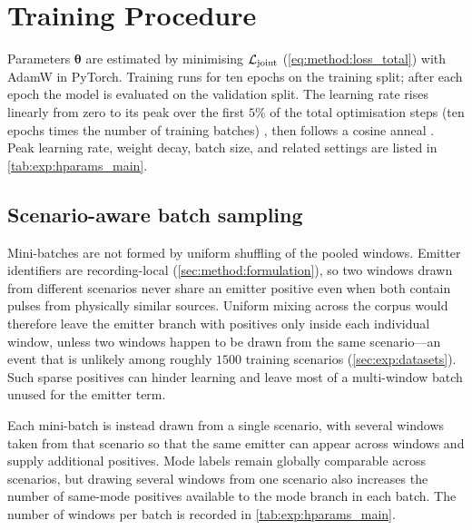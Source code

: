 \section{Training Procedure}\label{sec:method:training}

Parameters $\bm{\theta}$ are estimated by minimising $\mathcal{L}_{\mathrm{joint}}$
(\cref{eq:method:loss_total}) with AdamW \parencite{loshchilov2019adamw} in PyTorch.
Training runs for ten epochs on the training split; after each epoch the model is evaluated on the validation split.
The learning rate rises linearly from zero to its peak over the first $5\%$ of the total optimisation steps (ten epochs times the number of training batches) \parencite{goyal2017accurate}, then follows a cosine anneal \parencite{loshchilov2017sgdr}.
Peak learning rate, weight decay, batch size, and related settings are listed in \cref{tab:exp:hparams_main}.

\subsection*{Scenario-aware batch sampling}\label{sec:method:training:sampler}

Mini-batches are not formed by uniform shuffling of the pooled windows.
Emitter identifiers are recording-local
(\cref{sec:method:formulation}), so two windows drawn from different
scenarios never share an emitter positive even when both contain
pulses from physically similar sources.
Uniform mixing across the corpus would therefore leave the emitter
branch with positives only inside each individual window, unless two
windows happen to be drawn from the same scenario---an event that is
unlikely among roughly \(1500\) training scenarios
(\cref{sec:exp:datasets}).
Such sparse positives can hinder learning and leave most of a
multi-window batch unused for the emitter term.

Each mini-batch is instead drawn from a single scenario, with several
windows taken from that scenario so that the same emitter can appear
across windows and supply additional positives.
Mode labels remain globally comparable across scenarios, but drawing
several windows from one scenario also increases the number of
same-mode positives available to the mode branch in each batch.
The number of windows per batch is recorded in \cref{tab:exp:hparams_main}.
